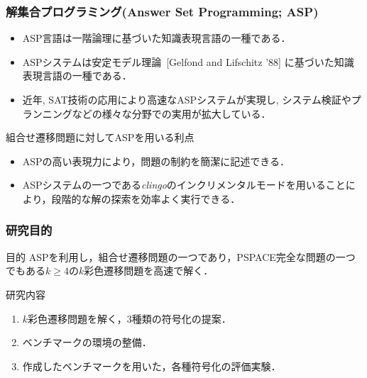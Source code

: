 \documentclass[dvipdfmx,11pt]{beamer}
\begin{document}
\begin{frame}\frametitle{解集合プログラミング(Answer Set Programming; ASP)}

  \begin{itemize}
    \item ASP言語は一階論理に基づいた知識表現言語の一種である．
    \item ASPシステムは安定モデル理論~[Gelfond and Lifschitz '88] に基づいた知識表現言語の一種である．
    \item 近年, SAT技術の応用により高速なASPシステムが実現し, システム検証やプランニングなどの様々な分野での実用が拡大している．
  \end{itemize}

  \begin{alertblock}{組合せ遷移問題に対してASPを用いる利点}
    \begin{itemize}
      \item ASPの高い表現力により，問題の制約を簡潔に記述できる．
      \item ASPシステムの一つである\textit{clingo}のインクリメンタルモードを用いることにより，段階的な解の探索を効率よく実行できる．
    \end{itemize}
  \end{alertblock}
  
\end{frame}


\begin{frame}\frametitle{研究目的}
  \begin{alertblock}{目的}
    ASPを利用し，組合せ遷移問題の一つであり，PSPACE完全な問題の一つでもある$k \ge 4$の$k$彩色遷移問題を高速で解く．%
  \end{alertblock}

  \begin{block}{研究内容}
    \begin{enumerate}
      \item $k$彩色遷移問題を解く，3種類の符号化の提案．
      \item ベンチマークの環境の整備．
      \item 作成したベンチマークを用いた，各種符号化の評価実験．
    \end{enumerate}
  \end{block}

\end{frame}
\end{document}
